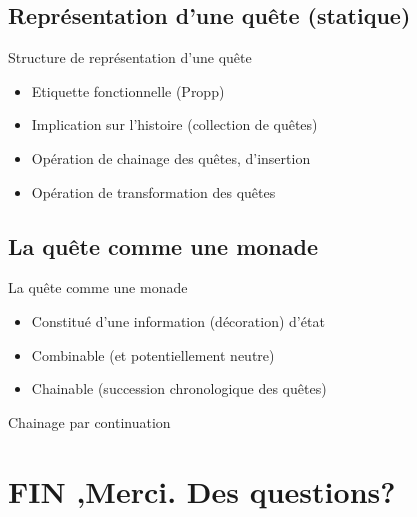 \documentclass{beamer}
\begin{document}
\subsection{Représentation d'une quête (statique)}
\begin{frame}{Structure de représentation d'une quête}
  \begin{itemize}
  \item  Etiquette fonctionnelle (Propp)
    \item Implication sur l'histoire (collection de quêtes)
    \item Opération de chainage des quêtes, d'insertion
    \item Opération de transformation des quêtes
    \end{itemize}
\end{frame}

\subsection{La quête comme une monade}
\begin{frame}{La quête comme une monade}
  \begin{itemize}
  \item  Constitué d'une information (décoration) d'état
  \item Combinable (et potentiellement neutre)
  \item Chainable (succession chronologique des quêtes)
  \end{itemize}
Chainage par continuation
\end{frame}

\section{FIN ,Merci. Des questions?}
\end{document}
